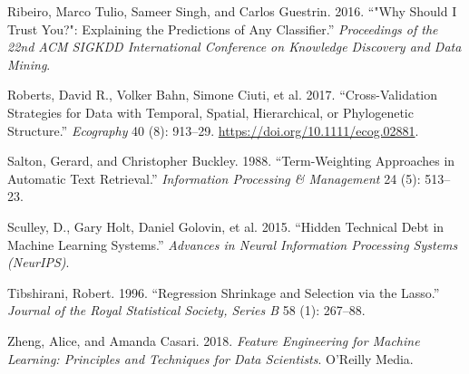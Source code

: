 \begin{CSLReferences}{1}{1}
Ribeiro, Marco Tulio, Sameer Singh, and Carlos Guestrin. 2016. {``"Why Should {I} Trust You?": Explaining the Predictions of Any Classifier.''} \emph{Proceedings of the 22nd ACM SIGKDD International Conference on Knowledge Discovery and Data Mining}.

Roberts, David R., Volker Bahn, Simone Ciuti, et al. 2017. {``Cross-Validation Strategies for Data with Temporal, Spatial, Hierarchical, or Phylogenetic Structure.''} \emph{Ecography} 40 (8): 913--29. \url{https://doi.org/10.1111/ecog.02881}.

Salton, Gerard, and Christopher Buckley. 1988. {``Term-Weighting Approaches in Automatic Text Retrieval.''} \emph{Information Processing \& Management} 24 (5): 513--23.

Sculley, D., Gary Holt, Daniel Golovin, et al. 2015. {``Hidden Technical Debt in Machine Learning Systems.''} \emph{Advances in Neural Information Processing Systems (NeurIPS)}.

Tibshirani, Robert. 1996. {``Regression Shrinkage and Selection via the Lasso.''} \emph{Journal of the Royal Statistical Society, Series B} 58 (1): 267--88.

Zheng, Alice, and Amanda Casari. 2018. \emph{Feature Engineering for Machine Learning: Principles and Techniques for Data Scientists}. O'Reilly Media.

\end{CSLReferences}
